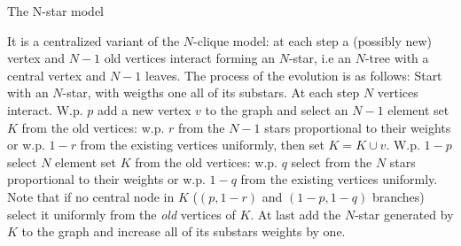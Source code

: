 \begin{block}{The N-star model}\small
  
  It is a centralized variant of the $N$-clique model: at each step a (possibly new) vertex and $N-1$ old vertices interact forming an $N$-star, i.e an $N$-tree with a central vertex and $N-1$ leaves.
  The process of the evolution is as follows: Start with an $N$-star, with weigths one all of its substars. At each step $N$ vertices interact. W.p. $p$ add a new vertex $v$ to the graph and select an $N-1$ element set $K$ from the old vertices: w.p. $r$ from the $N-1$ stars proportional to their weights or w.p. $1-r$ from the existing vertices uniformly, then set $K=K\cup{v}$. W.p. $1-p$ select $N$ element set $K$ from the old vertices: w.p. $q$ select from the $N$ stars proportional to their weights or w.p. $1-q$ from the existing vertices uniformly.  Note that if no central node in $K$ ($(p,1-r)$ and $(1-p,1-q)$ branches) select it uniformly from the {\small\it old} vertices of $K$. At last add the $N$-star generated by $K$ to the graph and increase all of its substars weights by one.
\end{block}
